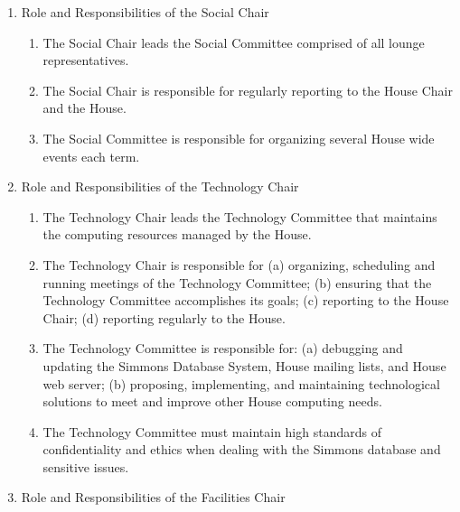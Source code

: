 \documentclass[letterpaper]{article}
\begin{document}
\begin{enumerate}
\begin{enumerate}
\begin{enumerate}
\end{enumerate}

\item Role and Responsibilities of the Social Chair

\begin{enumerate}

\item The Social Chair leads the Social Committee comprised of all lounge representatives.

\item The Social Chair is responsible for regularly reporting to the House Chair and the House.

\item The Social Committee is responsible for organizing several House wide events each term.

\end{enumerate}

\item Role and Responsibilities of the Technology Chair

\begin{enumerate}

\item The Technology Chair leads the Technology Committee that maintains the computing resources managed by the House.

\item The Technology Chair is responsible for (a) organizing, scheduling and running meetings of the Technology Committee; (b) ensuring that the Technology Committee accomplishes its goals; (c) reporting to the House Chair; (d) reporting regularly to the House.

\item The Technology Committee is responsible for: (a) debugging and updating the Simmons Database System, House mailing lists, and House web server; (b) proposing, implementing, and maintaining technological solutions to meet and improve other House computing needs.

\item The Technology Committee must maintain high standards of confidentiality and ethics when dealing with the Simmons database and sensitive issues.

\end{enumerate}

\item Role and Responsibilities of the Facilities Chair

\begin{enumerate}


\end{enumerate}
\end{enumerate}
\end{enumerate}
\end{document}
